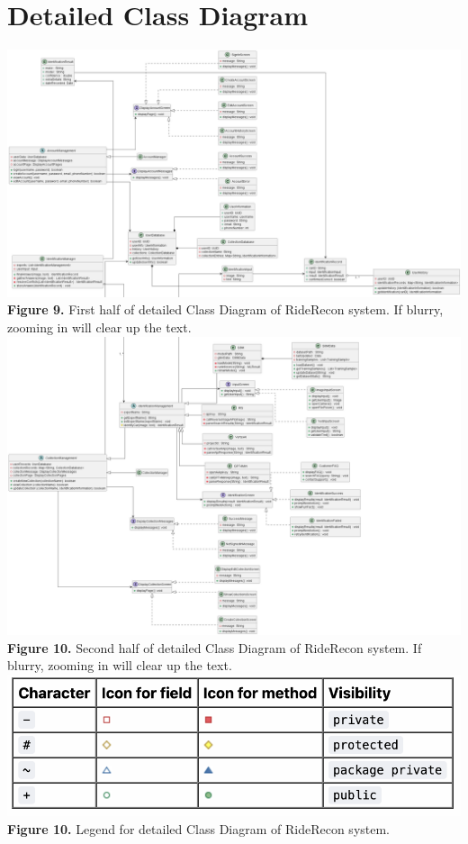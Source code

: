 \documentclass[]{article}
\begin{document}
\section{Detailed Class Diagram}
\label{sec:detailed_class_diagram}
\begin{center}
	\includegraphics[scale=0.335]{Class Diagram/class_diagram1.png}\\
	\textbf{Figure 9.} First half of detailed Class Diagram of RideRecon system. If blurry, zooming in will clear up the text.\\

	\includegraphics[scale=0.4]{Class Diagram/class_diagram2.png}\\
	\textbf{Figure 10.} Second half of detailed Class Diagram of RideRecon system. If blurry, zooming in will clear up the text.\\

	\includegraphics[scale=0.4]{Class Diagram/class_diagram_legend.png}\\
	\textbf{Figure 10.} Legend for detailed Class Diagram of RideRecon system.\\
\end{center}
\end{document}
